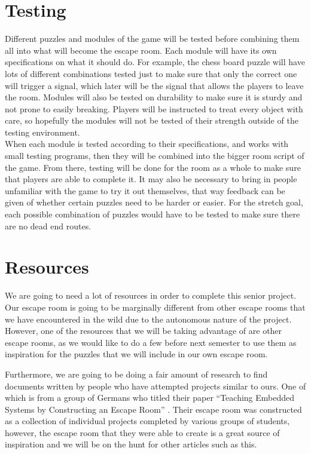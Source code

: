 \documentclass[conference]{IEEEtran}
\begin{document}
\section{Testing}
Different puzzles and modules of the game will be tested before combining
them all into what will become the escape room. Each module will have its
own specifications on what it should do. For example, the chess board puzzle
will have lots of different combinations tested just to make sure that only
the correct one will trigger a signal, which later will be the signal that
allows the players to leave the room. Modules will also be tested on
durability to make sure it is sturdy and not prone to easily breaking.
Players will be instructed to treat every object with care, so hopefully
the modules will not be tested of their strength outside of the testing
environment.
\\
\indent When each module is tested according to their specifications, and works
with small testing programs, then they will be combined into the bigger
room script of the game. From there, testing will be done for the room
as a whole to make sure that players are able to complete it. It may also
be necessary to bring in people unfamiliar with the game to try it out
themselves, that way feedback can be given of whether certain puzzles
need to be harder or easier. For the stretch goal, each possible combination
of puzzles would have to be tested to make sure there are no dead end routes.

\section{Resources}
We are going to need a lot of resources in order to complete this senior project.
Our escape room is going to be marginally different from other escape rooms that we have
encountered in the wild due to the autonomous nature of the project. However,
one of the resources that we will be taking advantage of are other escape rooms,
as we would like to do a few before next semester to use them as inspiration for
the puzzles that we will include in our own escape room.

Furthermore, we are going to
be doing a fair amount of research to find documents written by people who have attempted
projects similar to ours. One of which is from a group of Germans who titled their paper
``Teaching Embedded Systems by Constructing an Escape Room'' \cite{germanEscapeRoom}. Their
escape room was constructed as a collection of individual projects completed by various groups
of students, however, the escape room that they were able to create is a great source
of inspiration and we will be on the hunt for other articles such as this.
\end{document}
